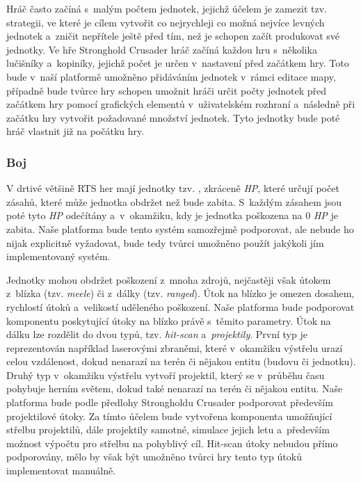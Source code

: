 Hráč často začíná s~malým počtem jednotek, jejichž účelem je zamezit tzv.  strategii, ve které je cílem vytvořit co nejrychleji co možná nejvíce levných jednotek a~zničit nepřítele ještě před tím, než je schopen začít produkovat své jednotky. Ve hře Stronghold Crusader hráč začíná každou hru s~několika lučišníky a~kopiníky, jejichž počet je určen v~nastavení před začátkem hry. Toto bude v~naší platformě umožněno přidáváním jednotek v~rámci editace mapy, případně bude tvůrce hry schopen umožnit hráči určit počty jednotek před začátkem hry pomocí grafických elementů v~uživatelském rozhraní a~následně při začátku hry vytvořit požadované množství jednotek. Tyto jednotky bude poté hráč vlastnit již na počátku hry.

\subsubsection{Boj}

V drtivé většině RTS her mají jednotky tzv.  , zkráceně \textit{HP}, které určují počet zásahů, které může jednotka obdržet než bude zabita. S~každým zásahem jsou poté tyto \textit{HP} odečítány a~v~okamžiku, kdy je jednotka poškozena na 0 \textit{HP} je zabita. Naše platforma bude tento systém samozřejmě podporovat, ale nebude ho nijak explicitně vyžadovat, bude tedy tvůrci umožněno použít jakýkoli jím implementovaný systém. 

Jednotky mohou obdržet poškození z~mnoha zdrojů, nejčastěji však útokem z~blízka (tzv. \textit{meele}) či z~dálky (tzv. \textit{ranged}). Útok na blízko je omezen dosahem, rychlostí útoků a~velikostí uděleného poškození. Naše platforma bude podporovat komponentu poskytující útoky na blízko právě s~těmito parametry. Útok na dálku lze rozdělit do dvou typů, tzv. \textit{hit-scan} a~\textit{projektily}. První typ je reprezentován například laserovými zbraněmi, které v~okamžiku výstřelu urazí celou vzdálenost, dokud nenarazí na terén či nějakou entitu (budovu či jednotku). Druhý typ v~okamžiku výstřelu vytvoří projektil, který se v~průběhu času pohybuje herním světem, dokud také nenarazí na terén či nějakou entitu. Naše platforma bude podle předlohy Strongholdu Crusader podporovat především projektilové útoky. Za tímto účelem bude vytvořena komponenta umožňující střelbu projektilů, dále projektily samotné, simulace jejich letu a~především možnost výpočtu pro střelbu na pohyblivý cíl. Hit-scan útoky nebudou přímo podporovány, mělo by však být umožněno tvůrci hry tento typ útoků implementovat manuálně.

